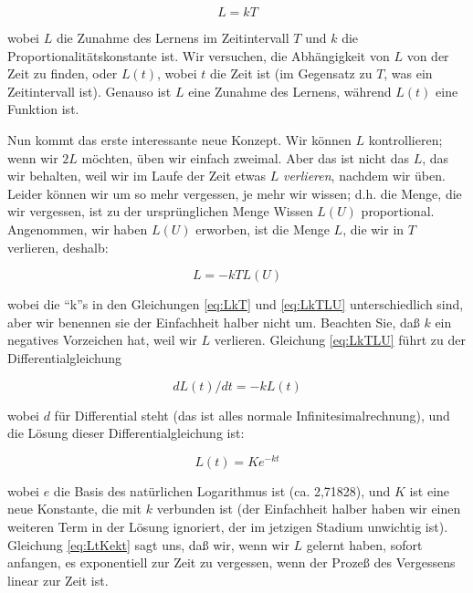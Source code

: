 \begin{equation}
\label{eq:LkT}
 L=kT
\end{equation}

wobei $L$ die Zunahme des Lernens im Zeitintervall $T$ und $k$ die Proportionalitätskonstante ist.
Wir versuchen, die Abhängigkeit von $L$ von der Zeit zu finden, oder $L(t)$, wobei $t$ die Zeit ist (im Gegensatz zu $T$, was ein Zeitintervall ist).
Genauso ist $L$ eine Zunahme des Lernens, während $L(t)$ eine Funktion ist.

Nun kommt das erste interessante neue Konzept.
Wir können $L$ kontrollieren; wenn wir $2L$ möchten, üben wir einfach zweimal.
Aber das ist nicht das $L$, das wir behalten, weil wir im Laufe der Zeit etwas $L$ \textit{verlieren}, nachdem wir üben.
Leider können wir um so mehr vergessen, je mehr wir wissen; d.h. die Menge, die wir vergessen, ist zu der ursprünglichen Menge Wissen $L(U)$ proportional.
Angenommen, wir haben $L(U)$ erworben, ist die Menge $L$, die wir in $T$ verlieren, deshalb:

\begin{equation}
\label{eq:LkTLU}
 L= -kTL(U)
\end{equation}

wobei die \enquote{k}s in den Gleichungen \ref{eq:LkT} und \ref{eq:LkTLU} unterschiedlich sind, aber wir benennen sie der Einfachheit halber nicht um.
Beachten Sie, daß $k$ ein negatives Vorzeichen hat, weil wir $L$ verlieren.
Gleichung \ref{eq:LkTLU} führt zu der Differentialgleichung

\begin{equation}
 dL(t)/dt=-kL(t)
\end{equation}

wobei $d$ für Differential steht (das ist alles normale Infinitesimalrechnung), und die Lösung dieser Differentialgleichung ist:

\begin{equation}
\label{eq:LtKekt}
 L(t)=Ke^{-kt}
\end{equation}

wobei $e$ die Basis des natürlichen Logarithmus ist (ca. 2,71828), und $K$ ist eine neue Konstante, die mit $k$ verbunden ist (der Einfachheit halber haben wir einen weiteren Term in der Lösung ignoriert, der im jetzigen Stadium unwichtig ist).
Gleichung \ref{eq:LtKekt} sagt uns, daß wir, wenn wir $L$ gelernt haben, sofort anfangen, es exponentiell zur Zeit zu vergessen, wenn der Prozeß des Vergessens linear zur Zeit ist.


